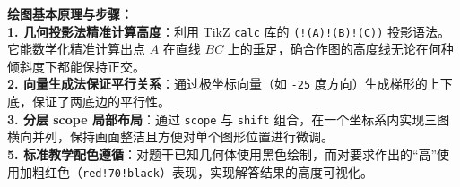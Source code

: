 \vspace{0.6cm}

{\small\color{blue!70!black}
\textbf{绘图基本原理与步骤：}\\
\textbf{1. 几何投影法精准计算高度}：利用 TikZ \texttt{calc} 库的 \texttt{(!(A)!(B)!(C))} 投影语法。它能数学化精准计算出点 $A$ 在直线 $BC$ 上的垂足，确合作图的高度线无论在何种倾斜度下都能保持正交。\\
\textbf{2. 向量生成法保证平行关系}：通过极坐标向量（如 \texttt{-25} 度方向）生成梯形的上下底，保证了两底边的平行性。\\
\textbf{3. 分层 scope 局部布局}：通过 \texttt{scope} 与 \texttt{shift} 组合，在一个坐标系内实现三图横向并列，保持画面整洁且方便对单个图形位置进行微调。\\
\textbf{5. 标准教学配色遵循}：对题干已知几何体使用黑色绘制，而对要求作出的“高”使用加粗红色（\texttt{red!70!black}）表现，实现解答结果的高度可视化。
}

\newpage
